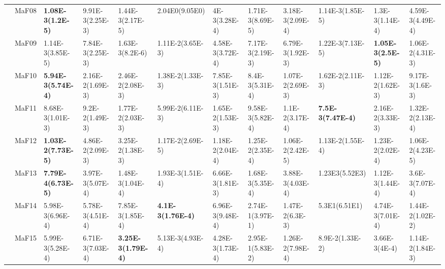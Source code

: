 \documentclass[]{article}
\begin{document}
\begin{landscape}
\begin{table}
\begin{footnotesize}
\begin{tabular}{|l|l|l|l|l|l|l|l|l|l|l|l|}
 & MaF08 & \cellcolor{gray95} {\bf 1.08E-3(1.2E-5)} & 9.91E-3(2.25E-3) & \cellcolor{gray95} 1.44E-3(2.17E-5) & 2.04E0(9.05E0) & 4E-3(3.28E-4) & 1.71E-3(8.69E-5) & 3.18E-3(2.09E-4) & \cellcolor{gray95} 1.14E-3(1.85E-5) & \cellcolor{gray95} 1.3E-3(1.14E-4) & 4.59E-3(4.49E-4)\\
 & MaF09 & \cellcolor{gray95} 1.14E-3(3.85E-5) & 7.84E-3(2.25E-3) & 1.63E-3(8.2E-6) & 1.11E-2(3.65E-3) & 4.58E-3(3.72E-4) & 7.17E-3(2.19E-3) & 6.79E-3(1.92E-3) & \cellcolor{gray95} 1.22E-3(7.13E-5) & \cellcolor{gray95} {\bf 1.05E-3(2.5E-5)} & 1.06E-2(4.31E-3)\\
 & MaF10 & \cellcolor{gray95} {\bf 5.94E-3(5.74E-4)} & 2.16E-2(1.69E-3) & 2.46E-2(2.08E-3) & 1.38E-2(1.33E-3) & \cellcolor{gray95} 7.85E-3(1.51E-3) & \cellcolor{gray95} 8.4E-3(5.31E-4) & 1.07E-2(2.69E-3) & 1.62E-2(2.11E-3) & 1.12E-2(1.62E-3) & 9.17E-3(1.6E-3)\\
 & MaF11 & \cellcolor{gray95} 8.68E-3(1.01E-3) & 9.2E-2(1.49E-3) & 1.77E-2(2.03E-3) & 5.99E-2(6.11E-3) & 1.65E-2(1.53E-3) & \cellcolor{gray95} 9.58E-3(5.82E-4) & \cellcolor{gray95} 1.1E-2(3.17E-4) & \cellcolor{gray95} {\bf 7.5E-3(7.47E-4)} & 2.16E-2(3.33E-3) & 1.32E-2(2.13E-4)\\
 & MaF12 & \cellcolor{gray95} {\bf 1.03E-2(7.73E-5)} & 4.86E-2(2.09E-3) & 3.25E-2(1.38E-3) & 1.17E-2(2.69E-5) & 1.18E-2(2.04E-4) & 1.25E-2(2.35E-4) & \cellcolor{gray95} 1.06E-2(2.42E-5) & 1.13E-2(1.55E-4) & 1.23E-2(2.02E-4) & \cellcolor{gray95} 1.06E-2(4.23E-5)\\
 & MaF13 & \cellcolor{gray95} {\bf 7.79E-4(6.73E-5)} & 3.97E-3(5.07E-4) & 1.48E-3(1.04E-4) & 1.93E-3(1.51E-4) & 6.66E-3(1.81E-3) & 1.68E-3(5.35E-4) & 3.88E-3(4.03E-4) & \cellcolor{gray95} 1.23E3(5.52E3) & \cellcolor{gray95} 1.12E-3(1.44E-4) & 3.6E-3(7.07E-4)\\
 & MaF14 & \cellcolor{gray95} 5.98E-3(6.96E-4) & \cellcolor{gray95} 5.78E-3(4.51E-4) & 7.85E-3(1.85E-4) & \cellcolor{gray95} {\bf 4.1E-3(1.76E-4)} & 6.96E-3(9.48E-4) & 2.74E-1(3.97E-1) & 1.47E-2(6.3E-3) & 5.3E1(6.51E1) & \cellcolor{gray95} 4.74E-3(7.01E-4) & 1.44E-2(1.02E-2)\\
 & MaF15 & 5.99E-3(5.28E-4) & 6.71E-3(7.03E-4) & \cellcolor{gray95} {\bf 3.25E-3(1.79E-4)} & 5.13E-3(4.93E-4) & \cellcolor{gray95} 4.28E-3(1.73E-4) & 2.95E-1(5.83E-2) & 1.26E-2(7.98E-4) & 8.9E-2(1.33E-2) & \cellcolor{gray95} 3.66E-3(4E-4) & 1.14E-2(1.84E-3)\\
\hline


\end{tabular}
\end{footnotesize}
\end{table}
\end{landscape}
\end{document}
